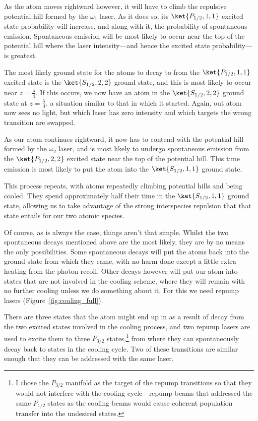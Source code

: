 As the atom moves rightward however, it will have to climb the repulsive potential hill formed by the $\omega_1$ laser. As it does so, its $\ket{P_{1/2}, 1,1}$ excited state probability will increase, and along with it, the probability of spontaneous emission. Spontaneous emission will be most likely to occur near the top of the potential hill where the laser intensity---and hence the excited state probability---is greatest.

The most likely ground state for the atoms to decay to from the $\ket{P_{1/2},1,1}$ excited state is the $\ket{S_{1/2}, 2,2}$ ground state, and this is most likely to occur near $z=\frac\lambda4$. If this occurs, we now have an atom in the $\ket{S_{1/2},2,2}$ ground state at $z=\frac\lambda4$, a situation similar to that in which it started. Again, out atom now sees no light, but which laser has zero intensity and which targets the wrong transition are swapped.

As our atom continues rightward, it now has to contend with the potential hill formed by the $\omega_2$ laser, and is most likely to undergo spontaneous emission from the $\ket{P_{1/2},2,2}$ excited state near the top of the potential hill. This time emission is most likely to put the atom into the $\ket{S_{1/2},1,1}$ ground state.

This process repeats, with atoms repeatedly climbing potential hills and being cooled. They spend approximately half their time in the $\ket{S_{1/2},1,1}$ ground state, allowing us to take advantage of the strong interspecies repulsion that that state entails for our two atomic species.

Of course, as is always the case, things aren't that simple. Whilst the two spontaneous decays mentioned above are the most likely, they are by no means the only possibilities. Some spontaneous decays will put the atoms back into the ground state from which they came, with no harm done except a little extra heating from the photon recoil. Other decays however will put our atom into states that are not involved in the cooling scheme, where they will remain with no further cooling unless we do something about it. For this we need repump lasers (Figure~\ref{fig:cooling_full}).

There are three states that the atom might end up in as a result of decay from the two excited states involved in the cooling process, and two repump lasers are used to excite them to three $P_{3/2}$ states,\footnote{I chose the $P_{3/2}$ manifold as the target of the repump transitions so that they would not interfere with the cooling cycle---repump beams that addressed the same $P_{1/2}$ states as the cooling beams would cause coherent population transfer into the undesired states.} from where they can spontaneously decay back to states in the cooling cycle. Two of these transitions are similar enough that they can be addressed with the same laser.


